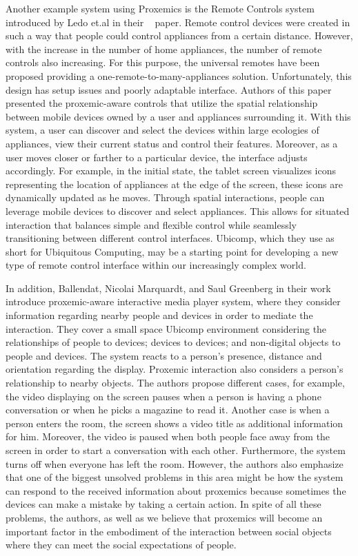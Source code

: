 Another example system using Proxemics is the Remote Controls system introduced by
Ledo et.al in their ~\cite{ledo2015proxemic} paper.
Remote control devices were created in such a way that people could
control appliances from a certain distance.
However, with the increase in the number of home appliances, the number of remote controls also increasing.
For this purpose, the universal remotes have been proposed providing a one-remote-to-many-appliances solution.
Unfortunately, this design has setup issues and poorly adaptable interface.
Authors of this paper presented the proxemic-aware controls that utilize the spatial relationship between
mobile devices owned by a user and appliances surrounding it.
With this system, a user can discover and select the devices within large ecologies of appliances,
view their current status and control their features.
Moreover, as a user moves closer or farther to a particular device, the interface adjusts accordingly.
For example, in the initial state, the tablet screen visualizes icons representing the
location of appliances at the edge of the screen, these icons are dynamically updated as he moves.
Through spatial interactions, people can leverage mobile devices to discover and select appliances.
This allows for situated interaction that balances simple and flexible control while seamlessly
transitioning between different control interfaces.
Ubicomp, which they use as short for Ubiquitous Computing, may be a starting point for
developing a new type of remote control interface within our increasingly complex world.

In addition, Ballendat, Nicolai Marquardt, and Saul Greenberg in their
work~\cite{ballendat2010proxemic} introduce proxemic-aware interactive media player system,
where they consider information regarding nearby people and devices in order to mediate the interaction.
They cover a small space Ubicomp environment considering the relationships of people to devices;
devices to devices;
and non-digital objects to people and devices.
The system reacts to a person’s presence, distance and orientation regarding the display.
Proxemic interaction also considers a person’s relationship to nearby objects.
The authors propose different cases, for example, the video displaying on the screen pauses
when a person is having a phone conversation or when he picks a magazine to read it.
Another case is when a person enters the room, the screen shows a video title as additional information for him.
Moreover, the video is paused when both people face away from the screen
in order to start a conversation with each other.
Furthermore, the system turns off when everyone has left the room.
However, the authors also emphasize that one of the biggest unsolved
problems in this area might be how the system can respond to the received information about
proxemics because sometimes the devices can make a mistake by taking a certain action.
In spite of all these problems, the authors, as well as we believe that proxemics will
become an important factor in the embodiment of the interaction between social objects
where they can meet the social expectations of people.

